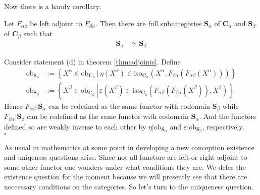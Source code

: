 Now there is a handy corollary.
\\
\begin{cor}
\label{cor:adjointequiv}
Let $F_{\alpha\beta}$ be left adjoint to $F_{\beta\alpha}$. Then there are full subcategories $\mathbf{S}_{\alpha}$ of $\mathbf{C}_{\alpha}$ and $\mathbf{S}_{\beta}$ of $\mathbf{C}_{\beta}$ such that
\begin{align*}
  \mathbf{S}_{\alpha}
  &\simeq
  \mathbf{S}_{\beta}
\end{align*}
\end{cor}
\begin{prf}
Consider statement (d) in theorem \ref{thm:adjoints}. Define
\begin{align*}
  \mathrm{ob}_{\mathbf{S}_{\alpha}}
  &:=
  \left\lbrace
      X^{\alpha}
      \in
      \mathrm{ob}_{\mathbf{C}_{\alpha}}
    \,
    \vert
    \,
      \eta(X^{\alpha})
      \in
      \mathrm{iso}_{\mathbf{C}_{\alpha}}
      \left(
        X^{\alpha},
        F_{\beta\alpha}
        \left(
          F_{\alpha\beta}(X^{\alpha})
        \right)
      \right)
  \right\rbrace
  \\
  \mathrm{ob}_{\mathbf{S}_{\beta}}
  &:=
  \left\lbrace
      X^{\beta}
      \in
      \mathrm{ob}_{\mathbf{C}_{\beta}}
    \,
    \left\vert
    \,
      \varepsilon(X^{\beta})
      \in
      \mathrm{iso}_{\mathbf{C}_{\beta}}
      \left(
        F_{\alpha\beta}
        \left(
          F_{\beta\alpha}(X^{\beta})
        \right),
        X^{\beta}
      \right)
    \right.
  \right\rbrace
\end{align*}
Hence $F_{\alpha\beta} \vert \mathbf{S}_{\alpha}$ can be redefined as {\glqq}the same{\grqq} functor with codomain $\mathbf{S}_{\beta}$ while $F_{\beta\alpha} \vert \mathbf{S}_{\beta}$ can be redefined as {\glqq}the same{\grqq} functor with codomain $\mathbf{S}_{\alpha}$. And the functors defined so are weakly inverse to each other by $\eta \vert \mathrm{ob}_{\mathbf{S}_{\alpha}}$ and $\varepsilon \vert \mathrm{ob}_{\mathbf{S}_{\beta}}$, respectively.
\\
\phantom{proven}
\hfill
$\square$
\end{prf}
As usual in mathematics at some point in developing a new conception existence and uniqeness questions arise. Since not all functors are left or right adjoint to some other functor one wonders under what conditions they are. We defer the existence question for the moment because we will presently see that there are neccessary conditions on the categories. So let's turn to the uniqueness question.
\\
